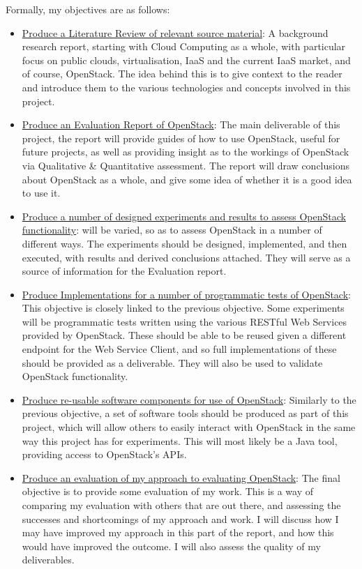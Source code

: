 Formally, my objectives are as follows:
\begin{itemize}

\item \underline{Produce a Literature Review of relevant source material}: A background research report, starting with Cloud Computing as a whole, with particular focus on public clouds, virtualisation, IaaS and the current IaaS market, and of course, OpenStack. The idea behind this is to give context to the reader and introduce them to the various technologies and concepts involved in this project. 

\item \underline{Produce an Evaluation Report of OpenStack}: The main deliverable of this project, the report will provide guides of how to use OpenStack, useful for future projects, as well as providing insight as to the workings of OpenStack via Qualitative \& Quantitative assessment. The report will draw conclusions about OpenStack as a whole, and give some idea of whether it is a good idea to use it. 

\item \underline{Produce a number of designed experiments and results to assess OpenStack functionality}: will be varied, so as to assess OpenStack in a number of different ways. The experiments should be designed, implemented, and then executed, with results and derived conclusions attached. They will serve as a source of information for the Evaluation report. 

\item \underline{Produce Implementations for a number of programmatic tests of OpenStack}: This objective is closely linked to the previous objective. Some experiments will be programmatic tests written using the various RESTful Web Services provided by OpenStack. These should be able to be reused given a different endpoint for the Web Service Client, and so full implementations of these should be provided as a deliverable. They will also be used to validate OpenStack functionality. 

\item \underline{Produce re-usable software components for use of OpenStack}: Similarly to the previous objective, a set of software tools should be produced as part of this project, which will allow others to easily interact with OpenStack in the same way this project has for experiments. This will most likely be a Java tool, providing access to OpenStack's APIs. 

\item \underline{Produce an evaluation of my approach to evaluating OpenStack}: The final objective is to provide some evaluation of my work. This is a way of comparing my evaluation with others that are out there, and assessing the successes and shortcomings of my approach and work. I will discuss how I may have improved my approach in this part of the report, and how this would have improved the outcome. I will also assess the quality of my deliverables.   

\end{itemize}

